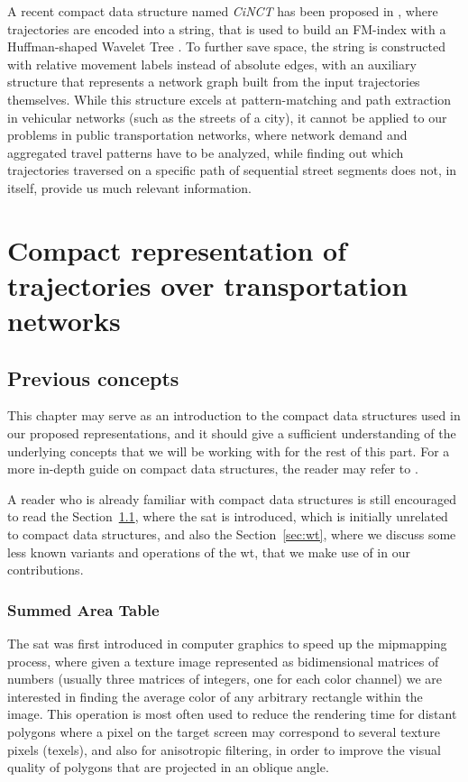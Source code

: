 \documentclass[a4paper,10pt,twoside]{book}
\begin{document}
    
    A recent compact data structure named {\em CiNCT} has been proposed in \cite{koide2018cinct}, where trajectories are encoded into a string, that is used to build an FM-index \cite{DBLP:conf/focs/FerraginaM00} with a Huffman-shaped Wavelet Tree \cite{ferragina2009compressed}. To further save space, the string is constructed with relative movement labels instead of absolute edges, with an auxiliary structure that represents a network graph built from the input trajectories themselves. While this structure excels at pattern-matching and path extraction in vehicular networks (such as the streets of a city), it cannot be applied to our problems in public transportation networks, where network demand and aggregated travel patterns have to be analyzed, while finding out which trajectories traversed on a specific path of sequential street segments does not, in itself, provide us much relevant information.
	
	
\part{Compact representation of trajectories over transportation networks} \label{part:cds}
\chapter{Previous concepts}
\label{ch:cds:prev}
	This chapter may serve as an introduction to the compact data structures used in our proposed representations, and it should give a sufficient understanding of the underlying concepts that we will be working with for the rest of this part. For a more in-depth guide on compact data structures, the reader may refer to \cite{Nav16}.
	
	A reader who is already familiar with compact data structures is still encouraged to read the Section~\ref{sec:sat}, where the \gls{sat} is introduced, which is initially unrelated to compact data structures, and also the Section~\ref{sec:wt}, where we discuss some less known variants and operations of the \gls{wt}, that we make use of in our contributions.
	
	\section{Summed Area Table}
	\label{sec:sat}
	The \gls{sat} was first introduced in computer graphics \cite{crow1984summed} to speed up the mipmapping process, where given a texture image represented as bidimensional matrices of numbers (usually three matrices of integers, one for each color channel) we are interested in finding the average color of any arbitrary rectangle within the image. This operation is most often used to reduce the rendering time for distant polygons where a pixel on the target screen may correspond to several texture pixels (texels), and also for anisotropic filtering, in order to improve the visual quality of polygons that are projected in an oblique angle.
\end{document}
